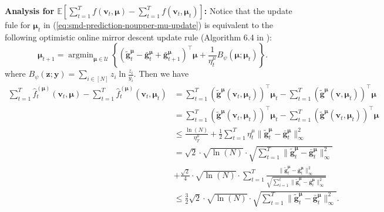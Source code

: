 \documentclass[12pt]{article}
\begin{document}
\textbf{Analysis for $\mathbb{E}\left [ \sum_{t=1}^T  f(\boldsymbol{v}_t,\boldsymbol{\mu}) -  \sum_{t=1}^T f(\boldsymbol{v}_t,\boldsymbol{\mu}_t)  \right]$:} Notice that the update fule for $\boldsymbol{\mu}_t$ in (\ref{eq:smd-prediction-noupper-mu-update}) is equivalent to the following optimistic online mirror descent update rule (Algorithm 6.4 in \cite{orabona2019modern}): 
\begin{equation*}
    \boldsymbol{\mu}_{t+1} = \mathop{\arg\min}_{\boldsymbol{\mu} \in \mathcal{U}} \left \{ \left(\tilde{\boldsymbol{g}}_t^{\boldsymbol{\mu}}  - \bar{\boldsymbol{g}}_t^{\boldsymbol{\mu}} + \bar{\boldsymbol{g}}_{t+1}^{\boldsymbol{\mu}} \right)^{\top} \boldsymbol{\mu} + \frac{1}{\eta_t^{\mu}} B_\psi(\boldsymbol{\mu};\boldsymbol{\mu}_t)  \right \}.
\end{equation*}
where $B_{\psi}(\boldsymbol{z};\boldsymbol{y}) = \sum_{i \in [N]} z_i \ln \frac{z_i}{y_i}$. Then we have
\begin{subequations}
    \begin{align}
    \sum_{t=1}^T  \hat{f}^{(\boldsymbol{\mu})}_t(\boldsymbol{v}_t,\boldsymbol{\mu}) -  \sum_{t=1}^T \hat{f}^{(\boldsymbol{\mu})}_t(\boldsymbol{v}_t,\boldsymbol{\mu}_t) & = \sum_{t=1}^T (\tilde{\boldsymbol{g}}^{\boldsymbol{\mu}}(\boldsymbol{v}_t,\boldsymbol{\mu}_t))^{\top} \boldsymbol{\mu}_t - \sum_{t=1}^T (\tilde{\boldsymbol{g}}^{\boldsymbol{\mu}}(\boldsymbol{v},\boldsymbol{\mu}_t))^{\top} \boldsymbol{\mu} \nonumber \\
    & = \sum_{t=1}^T (\tilde{\boldsymbol{g}}^{\boldsymbol{\mu}}(\boldsymbol{v}_t,\boldsymbol{\mu}_t))^{\top} \boldsymbol{\mu}_t - \sum_{t=1}^T (\tilde{\boldsymbol{g}}^{\boldsymbol{\mu}}(\boldsymbol{v}_t,\boldsymbol{\mu}_t))^{\top} \boldsymbol{\mu} \label{eq:proof-minimax-error-noupper-mu-oco-regret-a}\\
    & \le \frac{\ln(N)}{\eta_T^{\mu}} + \frac{1}{2} \sum_{t=1}^T \eta_t^{\mu} \|\tilde{\boldsymbol{g}}_t^{\boldsymbol{\mu}}  - \bar{\boldsymbol{g}}_t^{\boldsymbol{\mu}}\|_{\infty}^2 \label{eq:proof-minimax-error-noupper-mu-oco-regret-b}\\
    & = \sqrt{2} \cdot \sqrt{\ln(N)} \cdot \sqrt{\sum_{t=1}^T \|\tilde{\boldsymbol{g}}_t^{\boldsymbol{\mu}}  - \bar{\boldsymbol{g}}_t^{\boldsymbol{\mu}}\|_{\infty}^2} \nonumber \\
    & + \frac{\sqrt{2}}{4} \cdot \sqrt{\ln(N)} \cdot \sum_{t=1}^T \frac{\|\tilde{\boldsymbol{g}}_t^{\boldsymbol{\mu}}  - \bar{\boldsymbol{g}}_t^{\boldsymbol{\mu}}\|_{\infty}^2}{\sqrt{\sum_{i=1}^t \|\tilde{\boldsymbol{g}}^{\boldsymbol{\mu}}_i - \bar{\boldsymbol{g}}^{\boldsymbol{\mu}}_i\|_{\infty}^2}} \label{eq:proof-minimax-error-noupper-mu-oco-regret-c}\\
    & \le \frac{3}{2}\sqrt{2} \cdot \sqrt{\ln(N)} \cdot \sqrt{\sum_{t=1}^T \|\tilde{\boldsymbol{g}}_t^{\boldsymbol{\mu}}  - \bar{\boldsymbol{g}}_t^{\boldsymbol{\mu}}\|_{\infty}^2}. \label{eq:proof-minimax-error-noupper-mu-oco-regret-d}
    \end{align} 
    \label{eq:proof-minimax-error-noupper-mu-oco-regret}
\end{subequations}
\end{document}

